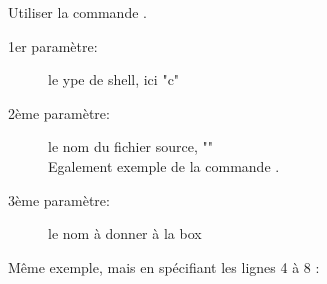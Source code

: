 Utiliser la commande .
\begin{description}
 \item[1er paramètre:] le ype de shell, ici "c"
 \item[2ème paramètre:] le nom du fichier source, ""\\ Egalement exemple de la commande .
 \item[3ème paramètre:] le nom à donner à la box
\end{description}



Même exemple, mais en spécifiant les lignes 4 à 8 :
